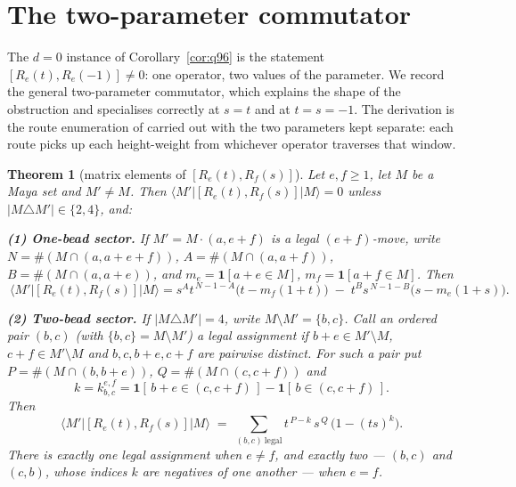 \documentclass[11pt]{article}
\newtheorem{theorem}{Theorem}
\theoremstyle{definition}
\begin{document}
\section{The two-parameter commutator}\label{sec:two}

The $d=0$ instance of Corollary~\ref{cor:q96} is the statement
$[R_e(t),R_e(-1)]\neq0$: one operator, two values of the parameter.  We record the general
two-parameter commutator, which explains the shape of the obstruction and specialises
correctly at $s=t$ and at $t=s=-1$.  The derivation is the route enumeration of
\cite[Thm.~2.3]{Clio0907} carried out with the two parameters kept separate: each route
picks up each height-weight from whichever operator traverses that window.

\begin{theorem}[{matrix elements of $[R_e(t),R_f(s)]$}]\label{thm:two}
Let $e,f\ge1$, let $M$ be a Maya set and $M'\neq M$.  Then
$\langle M'|[R_e(t),R_f(s)]|M\rangle=0$ unless $|M\triangle M'|\in\{2,4\}$, and:

\smallskip
\noindent\textbf{(1) One-bead sector.}  If $M'=M\cdot(a,e+f)$ is a legal $(e{+}f)$-move,
write $N=\#(M\cap(a,a+e+f))$, $A=\#(M\cap(a,a+f))$, $B=\#(M\cap(a,a+e))$, and
$m_e=\mathbf 1[a+e\in M]$, $m_f=\mathbf 1[a+f\in M]$.  Then
\[
  \boxed{\ \langle M'|[R_e(t),R_f(s)]|M\rangle
  = s^{A}t^{\,N-1-A}\bigl(t-m_f(1+t)\bigr)\;-\;t^{B}s^{\,N-1-B}\bigl(s-m_e(1+s)\bigr).\ }
\]

\smallskip
\noindent\textbf{(2) Two-bead sector.}  If $|M\triangle M'|=4$, write
$M\setminus M'=\{b,c\}$.  Call an ordered pair $(b,c)$ (with $\{b,c\}=M\setminus M'$) a
\emph{legal assignment} if $b+e\in M'\setminus M$, $c+f\in M'\setminus M$ and
$b,c,b+e,c+f$ are pairwise distinct.  For such a pair put $P=\#(M\cap(b,b+e))$,
$Q=\#(M\cap(c,c+f))$ and
\[
  k=k^{e,f}_{b,c}=\mathbf 1[\,b+e\in(c,c+f)\,]-\mathbf 1[\,b\in(c,c+f)\,].
\]
Then
\[
  \boxed{\ \langle M'|[R_e(t),R_f(s)]|M\rangle
  \;=\;\sum_{(b,c)\ \mathrm{legal}} t^{\,P-k}\,s^{\,Q}\,\bigl(1-(ts)^{k}\bigr).\ }
\]
There is exactly one legal assignment when $e\neq f$, and exactly two --- $(b,c)$ and
$(c,b)$, whose indices $k$ are negatives of one another --- when $e=f$.
\end{theorem}
\end{document}
